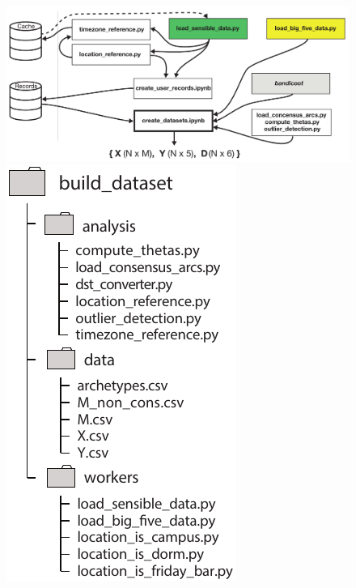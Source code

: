 \begin{figure}
	\centering
	\begin{minipage}[l]{0.80\textwidth}
		\includegraphics[width=\linewidth]{figures/preprocessing_pipeline}
	\end{minipage}
	\begin{minipage}[r]{0.19\textwidth}
		\includegraphics[width=\linewidth]{figures/preprocessing_repo}

\end{minipage}
\end{figure}
